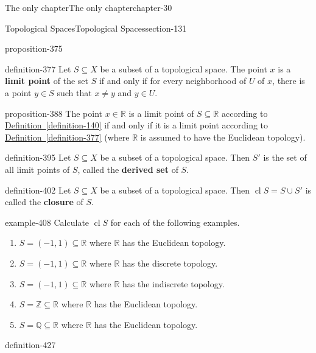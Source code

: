 \documentclass[oneside,10pt,]{book}
\newcommand{\terminology}[1]{\textbf{#1}}
\newcommand{\mb}{\mathbb}
\newcommand{\cl}{\operatorname{cl}}
\begin{document}
\begin{chapterptx}{The only chapter}{}{The only chapter}{}{}{chapter-30}
\begin{sectionptx}{Topological Spaces}{}{Topological Spaces}{}{}{section-131}
\begin{proposition}{}{}{proposition-375}
\end{proposition}
\begin{definition}{}{definition-377}%
\hypertarget{p-378}{}%
Let \(S\subseteq X\) be a subset of a topological space. The point \(x\) is a \terminology{limit point} of the set \(S\) if and only if for every neighborhood of \(U\) of \(x\), there is a point \(y\in S\) such that \(x\not=y\) and \(y\in U\).%
\end{definition}
\begin{proposition}{}{}{proposition-388}%
\hypertarget{p-389}{}%
The point \(x\in\mb R\) is a limit point of \(S\subseteq \mb R\) according to \hyperref[definition-140]{Definition~\ref{definition-140}} if and only if it is a limit point according to \hyperref[definition-377]{Definition~\ref{definition-377}} (where \(\mb R\) is assumed to have the Euclidean topology).%
\end{proposition}
\begin{definition}{}{definition-395}%
\hypertarget{p-396}{}%
Let \(S\subseteq X\) be a subset of a topological space. Then \(S'\) is the set of all limit points of \(S\), called the \terminology{derived set} of \(S\).%
\end{definition}
\begin{definition}{}{definition-402}%
\hypertarget{p-403}{}%
Let \(S\subseteq X\) be a subset of a topological space. Then \(\cl S=S\cup S'\) is called the \terminology{closure} of \(S\).%
\end{definition}
\begin{example}{}{example-408}%
\hypertarget{p-409}{}%
Calculate \(\cl S\) for each of the following examples.%
\leavevmode%
\begin{enumerate}
\item\hypertarget{li-412}{}\(S=(-1,1)\subseteq\mb R\) where \(\mb R\) has the Euclidean topology.%
\item\hypertarget{li-415}{}\(S=(-1,1)\subseteq\mb R\) where \(\mb R\) has the discrete topology.%
\item\hypertarget{li-418}{}\(S=(-1,1)\subseteq\mb R\) where \(\mb R\) has the indiscrete topology.%
\item\hypertarget{li-421}{}\(S=\mb Z\subseteq\mb R\) where \(\mb R\) has the Euclidean topology.%
\item\hypertarget{li-424}{}\(S=\mb Q\subseteq\mb R\) where \(\mb R\) has the Euclidean topology.%
\end{enumerate}
\end{example}
\begin{definition}{}{definition-427}%

\end{definition}
\end{sectionptx}
\end{chapterptx}
\end{document}
